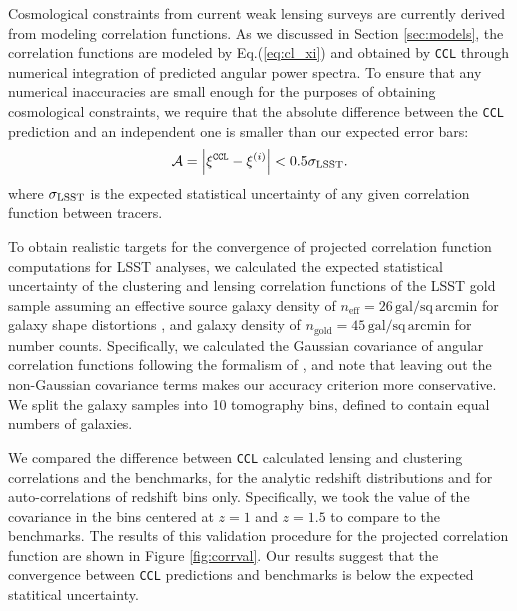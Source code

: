 \documentclass[\docopts]{\docclass}
\newcommand{\ccl}{{\tt CCL}\xspace}
\begin{document}
Cosmological constraints from current weak lensing surveys are currently derived from modeling correlation functions. As we discussed in Section \ref{sec:models}, the correlation functions are modeled by Eq.(\ref{eq:cl_xi}) and obtained by \ccl through numerical integration of predicted angular power spectra. To ensure that any numerical inaccuracies are small enough for the purposes of obtaining cosmological constraints, we require that the absolute difference between the \ccl prediction and an independent one is smaller than our expected error bars:
\begin{equation}
  \mathcal{A}=\left|\xi^{\tt CCL}-\xi^{(i)}\right|<0.5\sigma_{\rm LSST}.
\end{equation}
where $\sigma_{\rm LSST}$ is the expected statistical uncertainty of any given correlation function between tracers.

To obtain realistic targets for the convergence of projected correlation function computations for LSST analyses, we calculated the expected statistical uncertainty of the clustering and lensing correlation functions of the LSST gold sample \citep{LSSTSB} assuming an effective source galaxy density of $n_\mathrm{eff} = 26\,\mathrm{gal/sq\,arcmin}$ for galaxy shape distortions \citep{Chang13}, and galaxy density of $n_\mathrm{gold} = 45\,\mathrm{gal/sq\,arcmin}$ for number counts. Specifically, we calculated the Gaussian covariance of angular correlation functions following the formalism of \citet{2008A&A...477...43J}, and note that leaving out the non-Gaussian covariance terms makes our accuracy criterion more conservative. We split the galaxy samples into 10 tomography bins, defined to contain equal numbers of galaxies.

We compared the difference between \ccl calculated lensing and clustering correlations and the benchmarks, for the analytic redshift distributions and for auto-correlations of redshift bins only. Specifically, we took the value of the covariance in the bins centered at $z=1$ and $z=1.5$ to compare to the benchmarks. The results of this validation procedure for the projected correlation function are shown in Figure \ref{fig:corrval}. Our results suggest that the convergence between \ccl predictions and benchmarks is below the expected statitical uncertainty. 
\end{document}
